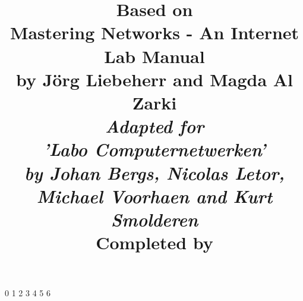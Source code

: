 

\title{
\textbf{Based on \\ Mastering Networks - An Internet Lab Manual\\
by J\"{o}rg Liebeherr and Magda Al Zarki}\\
\vspace{10mm}
\large{\emph{Adapted for \\ 'Labo Computernetwerken' \\
by Johan Bergs, Nicolas Letor, Michael Voorhaen and Kurt Smolderen}} \\
\vspace{10mm}
\large{Completed by}
\vspace{-10mm}
}




\frontmatter
\maketitle

\mainmatter
%
\setcounter {chapter} {0}
%
\setcounter {chapter} {1}
%
\setcounter {chapter} {2}
%
\setcounter {chapter} {3}
%
\setcounter {chapter} {4}
%
\setcounter {chapter} {5}
%
\setcounter {chapter} {6}

\backmatter


 

